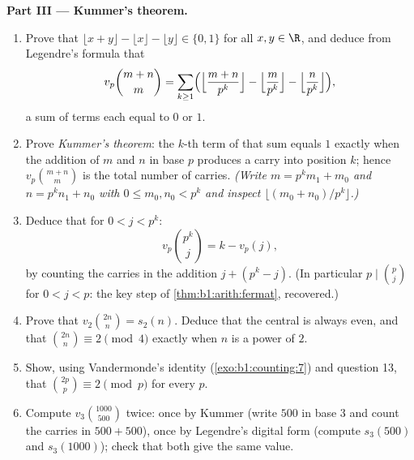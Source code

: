 \begin{problem}
\medskip
\noindent\textbf{Part III --- Kummer's theorem.}
\begin{enumerate}[resume]
  \item Prove that $\lfloor x + y \rfloor - \lfloor x \rfloor -
        \lfloor y \rfloor \in \{0, 1\}$ for all $x, y \in \R$, and
        deduce from Legendre's formula that
        \[
        v_p\binom{m+n}m
        = \sum_{k\geq1}\Bigl(
        \Bigl\lfloor\frac{m+n}{p^k}\Bigr\rfloor
        - \Bigl\lfloor\frac{m}{p^k}\Bigr\rfloor
        - \Bigl\lfloor\frac{n}{p^k}\Bigr\rfloor\Bigr),
        \]
        a sum of terms each equal to $0$ or $1$.
  \item Prove \emph{Kummer's theorem}: the $k$-th term of that sum
        equals $1$ exactly when the addition of $m$ and $n$ in
        base $p$ produces a carry into position $k$; hence
        $v_p\binom{m+n}m$ is the total number of carries.
        \emph{(Write $m = p^km_1 + m_0$ and $n = p^kn_1 + n_0$
        with $0 \leq m_0, n_0 < p^k$ and inspect $\lfloor (m_0 +
        n_0)/p^k \rfloor$.)}
  \item Deduce that for $0 < j < p^k$:
        \[
        v_p\binom{p^k}{j} = k - v_p(j) ,
        \]
        by counting the carries in the addition $j + (p^k - j)$.
        (In particular $p \mid \binom p j$ for $0 < j < p$: the
        key step of \cref{thm:b1:arith:fermat}, recovered.)
  \item Prove that $v_2\binom{2n}n = s_2(n)$. Deduce that the
        central  is always even, and that
        $\binom{2n}n \equiv 2 \pmod 4$ exactly when $n$ is a power
        of $2$.
  \item Show, using Vandermonde's identity
        (\cref{exo:b1:counting:7}) and question 13, that
        $\binom{2p}p \equiv 2 \pmod p$ for every  $p$.
  \item Compute $v_3\binom{1000}{500}$ twice: once by Kummer
        (write $500$ in base $3$ and count the carries in $500 +
        500$), once by Legendre's digital form (compute $s_3(500)$
        and $s_3(1000)$); check that both give the same value.
\end{enumerate}


\end{problem}
